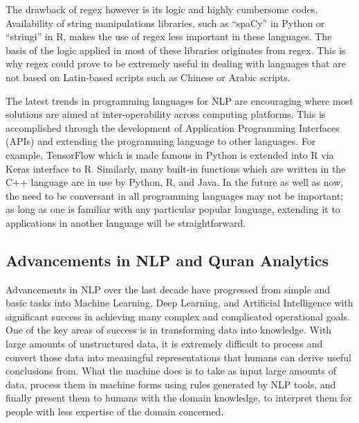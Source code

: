 \documentclass[
]{article}
\begin{document}
The drawback of regex however is its logic and highly cumbersome codes. Availability of string manipulations libraries, such as ``spaCy'' in Python or ``stringi'' in R, makes the use of regex less important in these languages. The basis of the logic applied in most of these libraries originates from regex. This is why regex could prove to be extremely useful in dealing with languages that are not based on Latin-based scripts such as Chinese or Arabic scripts.

The latest trends in programming languages for NLP are encouraging where most solutions are aimed at inter-operability across computing platforms. This is accomplished through the development of Application Programming Interfaces (APIs) and extending the programming language to other languages. For example, TensorFlow which is made famous in Python is extended into R via Keras interface to R. Similarly, many built-in functions which are written in the C++ language are in use by Python, R, and Java. In the future as well as now, the need to be conversant in all programming languages may not be important; as long as one is familiar with any particular popular language, extending it to applications in another language will be straightforward.

\hypertarget{advancements-in-NLP-and-quran-analytics}{%
\subsection{Advancements in NLP and Quran Analytics}\label{advancements-in-NLP-and-quran-analytics}}

Advancements in NLP over the last decade have progressed from simple and basic tasks into Machine Learning, Deep Learning, and Artificial Intelligence with significant success in achieving many complex and complicated operational goals. One of the key areas of success is in transforming data into knowledge. With large amounts of unstructured data, it is extremely difficult to process and convert those data into meaningful representations that humans can derive useful conclusions from. What the machine does is to take as input large amounts of data, process them in machine forms using rules generated by NLP tools, and finally present them to humans with the domain knowledge, to interpret them for people with less expertise of the domain concerned.
\end{document}
